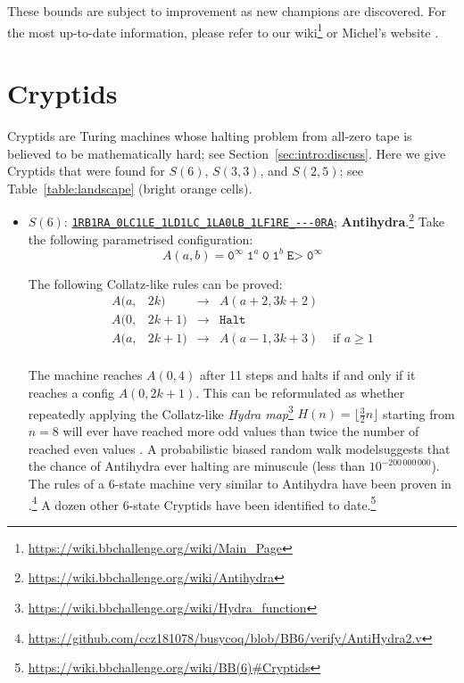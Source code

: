 \documentclass[a4paper,british]{article}
\theoremstyle{definition} %
\numberwithin{equation}{section}
\theoremstyle{definition} %
\newcommand{\tm}[1]{\href{https://bbchallenge.org/#1}{\texttt{\nolinkurl{#1}}}}
\newcommand{\szero}{\texttt{0}\xspace}
\newcommand{\sone}{\texttt{1}\xspace}
\begin{document}
These bounds are subject to improvement as new champions are discovered. For the most up-to-date information, please refer to our wiki\footnote{\url{https://wiki.bbchallenge.org/wiki/Main_Page}} or Michel’s website \cite{PMichel_website}.


\section{Cryptids}\label{app:cryptids}

Cryptids are Turing machines whose halting problem from all-zero tape is believed to be mathematically hard; see Section~\ref{sec:intro:discuss}. Here we give Cryptids that were found for $S(6)$, $S(3,3)$, and $S(2,5)$; see Table~\ref{table:landscape} (bright orange cells).

\begin{itemize}
    \item $S(6)$: \tm{1RB1RA_0LC1LE_1LD1LC_1LA0LB_1LF1RE_---0RA}; \textbf{Antihydra}.\footnote{\label{note:antihydra}\url{https://wiki.bbchallenge.org/wiki/Antihydra}} Take the following parametrised configuration:
          $$ A(a,b) = \szero^\infty \; \sone^a \; \szero \; \sone^b \; \texttt{E>} \; \szero^\infty$$

          The following Collatz-like rules can be proved:
          \[
              \begin{array}{llcll}
                  A(a, & 2k)   & \longrightarrow & A(a+2, 3k+2)                         \\
                  A(0, & 2k+1) & \longrightarrow & \texttt{Halt}                        \\
                  A(a, & 2k+1) & \longrightarrow & A(a-1, 3k+3)  & \text{ if } a \geq 1 \\
              \end{array}
          \]

          The machine reaches $A(0,4)$ after 11 steps and halts if and only if it reaches a config $A(0,2k+1)$. This can be reformulated as whether repeatedly applying the Collatz-like \textit{Hydra map}\footnote{\url{https://wiki.bbchallenge.org/wiki/Hydra_function}} $H(n) = \lfloor \frac{3}{2}n\rfloor$ starting from $n=8$ will ever have reached more odd values than twice the number of reached even values \cite{ligocki2024bb6antis}. A probabilistic biased random walk model suggests that the chance of Antihydra ever halting are minuscule (less than $10^{-200\,000\,000}$). The rules of a 6-state machine very similar to Antihydra have been proven in \Coq.\footnote{\url{https://github.com/ccz181078/busycoq/blob/BB6/verify/AntiHydra2.v}} A dozen other 6-state Cryptids have been identified to date.\footnote{\url{https://wiki.bbchallenge.org/wiki/BB(6)\#Cryptids}}



\end{itemize}
\end{document}
